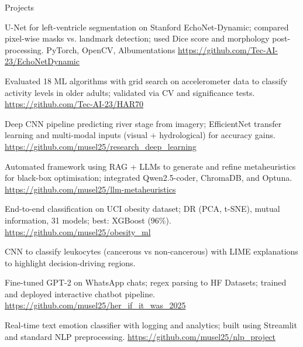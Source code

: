\begin{rubric}{Projects}
\noentry{~}

U-Net for left-ventricle segmentation on Stanford EchoNet-Dynamic; compared pixel-wise masks vs. landmark detection; used Dice score and morphology post-processing.\hfill {} PyTorch, OpenCV, Albumentations\hfill {} \url{https://github.com/Tec-AI-23/EchoNetDynamic}

Evaluated 18 ML algorithms with grid search on accelerometer data to classify activity levels in older adults; validated via CV and significance tests.\hfill {} \url{https://github.com/Tec-AI-23/HAR70}

Deep CNN pipeline predicting river stage from imagery; EfficientNet transfer learning and multi-modal inputs (visual + hydrological) for accuracy gains.\hfill {} \url{https://github.com/musel25/research_deep_learning}

Automated framework using RAG + LLMs to generate and refine metaheuristics for black-box optimisation; integrated Qwen2.5-coder, ChromaDB, and Optuna.\hfill {} \url{https://github.com/musel25/llm-metaheuristics}

End-to-end classification on UCI obesity dataset; DR (PCA, t-SNE), mutual information, 31 models; best: XGBoost (96\%).\hfill {} \url{https://github.com/musel25/obesity_ml}

CNN to classify leukocytes (cancerous vs non-cancerous) with LIME explanations to highlight decision-driving regions.

Fine-tuned GPT-2 on WhatsApp chats; regex parsing to HF Datasets; trained and deployed interactive chatbot pipeline.\hfill {} \url{https://github.com/musel25/her_if_it_was_2025}

Real-time text emotion classifier with logging and analytics; built using Streamlit and standard NLP preprocessing.\hfill {} \url{https://github.com/musel25/nlp_project}

\end{rubric}


